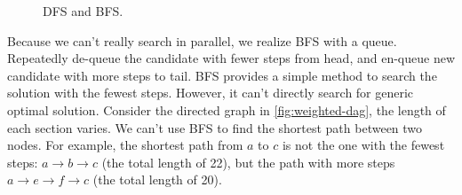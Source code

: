 \documentclass[b5paper]{article}
\begin{document}
\begin{figure}[htbp]
 \centering
 \caption{DFS and BFS.}
 \label{fig:dfs-bfs-tree}
\end{figure}

Because we can't really search in parallel, we realize BFS with a queue. Repeatedly de-queue the candidate with fewer steps from head, and en-queue new candidate with more steps to tail. BFS provides a simple method to search the solution with the fewest steps. However, it can't directly search for generic optimal solution. Consider the directed graph in \cref{fig:weighted-dag}, the length of each section varies. We can't use BFS to find the shortest path between two nodes. For example, the shortest path from $a$ to $c$ is not the one with the fewest steps: $a \to b \to c$ (the total length of 22), but the path with more steps $a \to e \to f \to c$ (the total length of 20).
\end{document}
